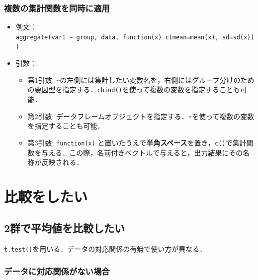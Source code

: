 \documentclass[
  xelatex, ja=standard]{bxjsarticle}
\providecommand{\tightlist}{%
  \setlength{\itemsep}{0pt}\setlength{\parskip}{0pt}}
\begin{document}
\subsubsection{複数の集計関数を同時に適用}\label{ux8907ux6570ux306eux96c6ux8a08ux95a2ux6570ux3092ux540cux6642ux306bux9069ux7528}

\begin{itemize}
\tightlist
\item
  例文：\texttt{aggregate(var1\ \textasciitilde{}\ group,\ data,\ function(x)\ c(mean=mean(x),\ sd=sd(x)))}
\item
  引数：

  \begin{itemize}
  \tightlist
  \item
    第1引数:
    \texttt{\textasciitilde{}}の左側には集計したい変数名を，右側にはグループ分けのための要因型を指定する．\texttt{cbind()}を使って複数の変数を指定することも可能．
  \item
    第2引数:
    データフレームオブジェクトを指定する．\texttt{+}を使って複数の変数を指定することも可能．
  \item
    第3引数: \texttt{function(x)}
    と置いたうえで\textbf{半角スペース}を置き，\texttt{c()}で集計関数を与える．この際，名前付きベクトルで与えると，出力結果にその名称が反映される．
  \end{itemize}
\end{itemize}

\section{比較をしたい}\label{ux6bd4ux8f03ux3092ux3057ux305fux3044}

\subsection{2群で平均値を比較したい}\label{ux7fa4ux3067ux5e73ux5747ux5024ux3092ux6bd4ux8f03ux3057ux305fux3044}

\texttt{t.test()}を用いる．データの対応関係の有無で使い方が異なる．

\subsubsection{データに対応関係がない場合}\label{ux30c7ux30fcux30bfux306bux5bfeux5fdcux95a2ux4fc2ux304cux306aux3044ux5834ux5408}
\end{document}
